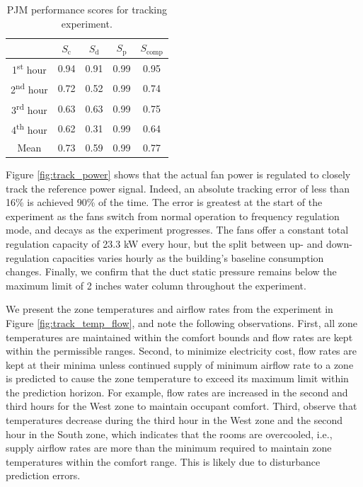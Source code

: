\begin{table}[b]
\centering
\begin{tabular}{c | c c c | c}
\toprule
 & $S_\text{c}$ & $S_\text{d}$ & $S_\text{p}$ & $S_\text{comp}$  \\ \hline
1\textsuperscript{st} hour & 0.94 & 0.91 & 0.99 & 0.95\\
2\textsuperscript{nd} hour & 0.72 & 0.52 & 0.99 & 0.74 \\
3\textsuperscript{rd} hour & 0.63 & 0.63 & 0.99 & 0.75 \\
4\textsuperscript{th} hour & 0.62 & 0.31 & 0.99 & 0.64 \\ %
Mean & 0.73 & 0.59 & 0.99 & 0.77 \\
\bottomrule
\end{tabular}
\caption{PJM performance scores for tracking experiment.}
\label{tab:tracking}
\end{table}

Figure \ref{fig:track_power} shows that the actual fan power is regulated to closely track the reference power signal. Indeed, an absolute tracking error of less than 16\% is achieved 90\% of the time. The error is greatest at the start of the experiment as the fans switch from normal operation to frequency regulation mode, and decays as the experiment progresses.
The fans offer a constant total regulation capacity of 23.3 kW every hour, %
but the split between up- and down-regulation capacities varies hourly as the building's baseline consumption changes. 
Finally, we confirm that the duct static pressure remains below the maximum limit of 2 inches water column throughout the experiment.

We present the zone temperatures and airflow rates from the experiment in Figure \ref{fig:track_temp_flow}, and note the following observations. 
First, all zone temperatures are maintained within the comfort bounds and flow rates are kept within the permissible ranges. 
Second, to minimize electricity cost, flow rates are kept at their minima unless continued supply of minimum airflow rate to a zone is predicted to cause the zone temperature to exceed its maximum limit within the prediction horizon. 
For example, flow rates are increased in the second and third hours for the West zone to maintain occupant comfort. 
Third, observe that temperatures decrease during the third hour in the West zone and the second hour in the South zone, which indicates that the rooms are overcooled, i.e., supply airflow rates are more than the minimum required to maintain zone temperatures within the comfort range. 
This is likely due to disturbance prediction errors.

